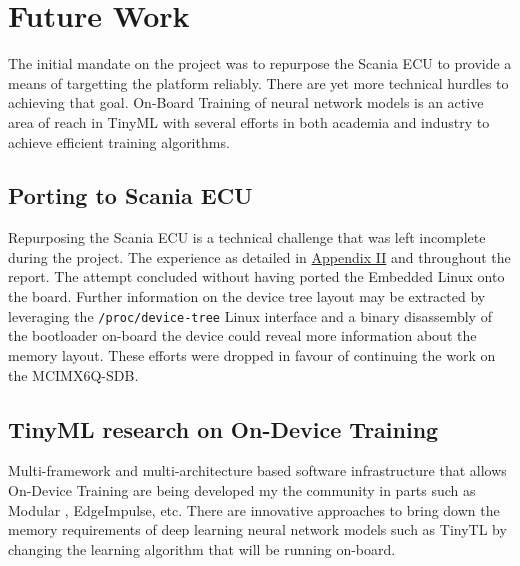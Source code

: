 \section{Future Work}

The initial mandate on the project was to repurpose the Scania ECU to provide a means of targetting the platform reliably. There are yet more technical hurdles to achieving that goal. On-Board Training of neural network models is an active area of reach in TinyML with several efforts in both academia and industry to achieve efficient training algorithms.

\subsection{Porting to Scania ECU}

Repurposing the Scania ECU is a technical challenge that was left incomplete during the project. The experience as detailed in \hyperref[rtc-c300]{Appendix II} and throughout the report. The attempt concluded without having ported the Embedded Linux onto the board. Further information on the device tree layout may be extracted by leveraging the \texttt{/proc/device-tree} Linux interface and a binary disassembly of the bootloader on-board the device could reveal more information about the memory layout. These efforts were dropped in favour of continuing the work on the MCIMX6Q-SDB.

\subsection{TinyML research on On-Device Training}

Multi-framework and multi-architecture based software infrastructure that allows On-Device Training are being developed my the community in parts such as Modular \cite{mojo}, EdgeImpulse, etc. There are innovative approaches to bring down the memory requirements of deep learning neural network models such as TinyTL \cite{cai2021tinytl} by changing the learning algorithm that will be running on-board.
